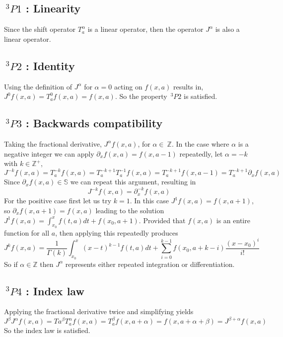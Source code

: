 \documentclass[%
 onecolumn,
 amsmath, amssymb, aps, pra, 10pt
]{revtex4-2}
\begin{document}
\subsection*{$\,^3P1$ : Linearity}
Since the shift operator $T_{a}^{\alpha}$ is a linear operator, then the operator $J^{\alpha}$ is also a linear operator.

\subsection*{$\,^3P2$ : Identity}
Using the definition of $J^{\alpha}$ for $\alpha=0$ acting on $f(x, a)$ results in, $J^{0}f(x, a) = T_{a}^{0}f(x, a) = f(x, a)$. So the property $\,^3P2$ is satisfied.

\subsection*{$\,^3P3$ : Backwards compatibility}
Taking the fractional derivative, $J^{\alpha} f(x, a)$, for $\alpha \in\ \mathbb{Z}$. In the case where $\alpha$ is a negative integer we can apply $\partial_x f(x, a) = f(x, a - 1)$ repeatedly, let $\alpha = -k$ with $k \in \mathbb{Z}^+$,
$$J^{-k} f(x, a) = T_{a}^{-k} f(x, a)=T_{a}^{-k + 1}T_{a}^{-1} f(x, a) = T_{a}^{-k + 1}f(x, a - 1) = T_{a}^{-k + 1}\partial_x f(x, a)$$
Since $\partial_x f(x, a) \in \mathbb{S}$ we can repeat this argument, resulting in
$$J^{-k} f(x, a) = \partial_{x}^{-k} f(x, a)$$
For the positive case first let us try $k=1$. In this case $J^{1} f(x, a) = f(x, a + 1)$, so $\partial_x f(x, a + 1) = f(x, a)$ leading to the solution $J^{1} f(x, a) = \int_{x_0}^{x} f(t, a)dt + f(x_0, a + 1)$. Provided that $f(x, a)$ is an entire function for all $a$, then applying this repeatedly produces
$$J^{k} f(x, a) = \frac{1}{\Gamma(k)}\int_{x_0}^{x} (x - t)^{k - 1}f(t, a)dt + \sum_{i = 0}^{k - 1}f(x_0, a + k - i)\frac{(x - x_0)^i}{i!}$$
So if $\alpha \in \mathbb{Z}$ then $J^{\alpha}$ represents either repeated integration or differentiation.

\subsection*{$\,^3P4$ : Index law}
Applying the fractional derivative twice and simplifying yields
$$J^{\beta}J^{\alpha} f(x, a) = T{a}^{\beta}T_{a}^{\alpha} f(x, a) = T_{a}^{\beta} f(x, a + \alpha) = f(x, a + \alpha + \beta) = J^{\beta + \alpha} f(x, a)$$
So the index law is satisfied.
\end{document}

